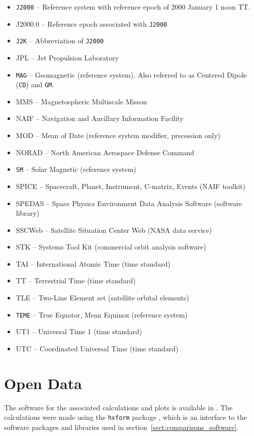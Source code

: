 \documentclass[draft]{agujournal2019}
\begin{document}
\begin{itemize}
\item  \texttt{J2000} -- Reference system with reference epoch of 2000 January 1 noon TT.
\item J2000.0 -- Reference epoch associated with  \texttt{J2000}
\item  \texttt{J2K} -- Abbreviation of  \texttt{J2000}
\item JPL -- Jet Propulsion Laboratory
\item  \texttt{MAG} -- Geomagnetic (reference system). Also referred to as Centered Dipole (\texttt{CD}) and \texttt{GM}.
\item MMS -- Magnetospheric Multiscale Misson 
\item NAIF -- Navigation and Ancillary Information Facility 
\item MOD -- Mean of Date (reference system modifier, precession only)
\item NORAD -- North American Aerospace Defense Command
\item  \texttt{SM} -- Solar Magnetic (reference system)
\item SPICE -- Spacecraft, Planet, Instrument, C-matrix, Events (NAIF toolkit)
\item SPEDAS -- Space Physics Environment Data Analysis Software (software library)
\item SSCWeb -- Satellite Situation Center Web (NASA data service)
\item STK -- Systems Tool Kit (commercial orbit analysis software)
\item TAI -- International Atomic Time (time standard)
\item TT -- Terrestrial Time (time standard)
\item TLE -- Two-Line Element set (satellite orbital elements)
\item  \texttt{TEME} -- True Equator, Mean Equinox (reference system)
\item UT1 -- Universal Time 1 (time standard)
\item UTC -- Coordinated Universal Time (time standard)
\end{itemize}

\section*{Open Data}

The software for the associated calculations and plots is available in . The calculations were made using the \texttt{hxform} package \cite{Weigel2025}, which is an interface to the software packages and libraries used in section~\ref {sect:comparisons_software}.
\end{document}
